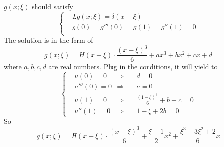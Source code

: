 \documentclass{article}
\begin{document}
\section{}
\subsection{}
$g(x;\xi)$ should satisfy
\[
	\left\{
	\begin{aligned}
	& L g(x;\xi) = \delta(x-\xi)\\
	& g(0) = g'''(0) = g(1) = g''(1) = 0\\
	\end{aligned}
	\right.
\]
The solution is in the form of 
\[
	g(x;\xi) = H(x-\xi) \cdot \frac{(x-\xi)^3}{6}+ a x^3 + bx^2+cx+d
\]		
where $a,b,c,d$ are real numbers. Plug in the conditions, it will yield to
\[\left\{
	\begin{aligned}
	&u(0) = 0     &\Rightarrow \quad& d = 0\\
	&u'''(0) = 0  &\Rightarrow \quad&a = 0 \\
	&u(1) = 0     &\Rightarrow \quad&\frac{(1-\xi)^3}{6}+b+c = 0\\
	&u''(1) = 0   &\Rightarrow \quad&1-\xi+2b = 0 
	\end{aligned}
  \right.
\]
So 
\[
	g(x;\xi) = H(x-\xi) \cdot \frac{(x-\xi)^3}{6}+ \frac{\xi-1}{2} x^2+\frac{\xi^3-3\xi^2+2}{6}x
\]
\end{document}
